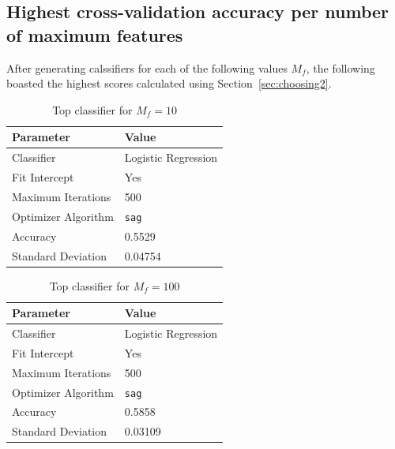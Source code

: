 \documentclass[11pt]{article}
\begin{document}
\subsection{Highest cross-validation accuracy per number of maximum features}\label{sec:mfresults}

After generating calssifiers for each of the following values $M_f$, the following boasted the highest scores calculated using Section~\ref{sec:choosing2}.

\begin{table}[!h]
	\begin{center}
		\begin{tabular}{|l|l|}			
			\hline
			Parameter & Value \\
			\hline\hline
			Classifier & Logistic Regression \\
			Fit Intercept & Yes \\
			Maximum Iterations & 500 \\
			Optimizer Algorithm & \texttt{sag} \\
			\hline\hline
			Accuracy &  0.5529\\
			Standard Deviation &  0.04754 \\
			\hline
		\end{tabular}
		\caption{Top classifier for $M_f = 10$}
		\label{tbl:mf10}
	\end{center}
\end{table}

\begin{table}[!h]
	\begin{center}
		\begin{tabular}{|l|l|}			
			\hline
			Parameter & Value \\
			\hline\hline
			Classifier & Logistic Regression \\
			Fit Intercept & Yes \\
			Maximum Iterations & 500 \\
			Optimizer Algorithm & \texttt{sag} \\
			\hline\hline
			Accuracy &  0.5858\\
			Standard Deviation &  0.03109 \\
			\hline
		\end{tabular}
		\caption{Top classifier for $M_f = 100$}
		\label{tbl:mf100}
	\end{center}
\end{table}
\end{document}
